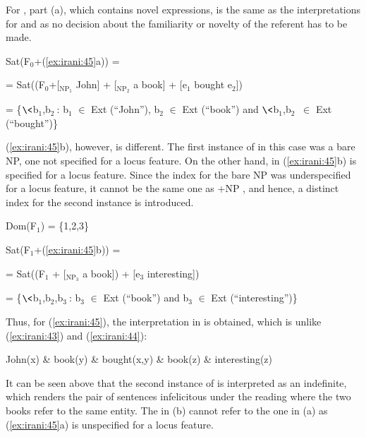 \documentclass[output=paper,
modfonts
]{langscibook}
\begin{document}
For , part (a), which contains novel expressions, is the same as the interpretations for  and  as no decision about the familiarity or novelty of the referent has to be made. 

\begin{exe}

\ex Sat(F$_0$+(\ref{ex:irani:45}a)) = \par 
= Sat((F$_0$+[$_{\text{NP}_{1}}$ John] + [$_{\text{NP}_{2}}$ a book] + [e$_1$ bought e$_2$])\par 
= \{$\<$b$_1$,b$_2\>$: b$_1$ \(\in\) Ext (``John''), b$_2$ \(\in\) Ext (``book'') and $\<$b$_1$,b$_2\>$ \(\in\) Ext (``bought'')\} \par 

\end{exe} 

(\ref{ex:irani:45}b), however, is different. The first instance of  in this case was a bare NP, one not specified for a locus feature. On the other hand,  in (\ref{ex:irani:45}b) is specified for a locus feature. Since the index for the bare NP  was underspecified for a locus feature, it cannot be the same one as +NP , and hence, a distinct index for the second instance is introduced. 

\begin{exe}

\ex Dom(F$_1$) = \{1,2,3\}\par 

Sat(F$_1$+(\ref{ex:irani:45}b)) = \par 
= Sat((F$_1$ + [$_{\text{NP}_{3}}$ a book]) + [e$_3$ interesting]) \par 
= \{$\<$b$_1$,b$_2$,b$_3\>$: b$_3$ \(\in\) Ext (``book'') and b$_3$ \(\in\) Ext (``interesting'')\} \par 

\end{exe}

Thus, for (\ref{ex:irani:45}), the interpretation in  is obtained, which is unlike (\ref{ex:irani:43}) and (\ref{ex:irani:44}): 

\begin{exe}

\ex\label{ex:irani:56} John(x) \& book(y) \& bought(x,y) \& book(z) \& interesting(z) \par 

\end{exe}

It can be seen above that the second instance of  is interpreted as an indefinite, which renders the pair of sentences infelicitous under the reading where the two books refer to the same entity. The  in (b) cannot refer to the one in (a) as (\ref{ex:irani:45}a) is unspecified for a locus feature. 
\end{document}
